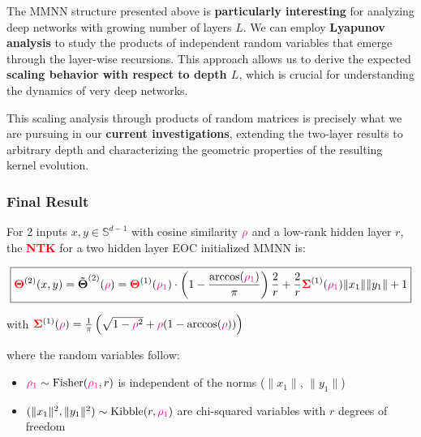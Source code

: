 \documentclass[a4paper]{article}
\theoremstyle{plain}
\theoremstyle{definition}
\theoremstyle{remark}
\begin{document}
\begin{tcolorbox}[colback=green!15,colframe=green!80!black,title={\textbf{Ongoing Research: Deep Network Scaling via Lyapunov Analysis}},enhanced,drop shadow,boxrule=2pt]
The MMNN structure presented above is \textbf{particularly interesting} for analyzing deep networks with growing number of layers $L$. We can employ \textbf{Lyapunov analysis} to study the products of independent random variables that emerge through the layer-wise recursions. This approach allows us to derive the expected \textbf{scaling behavior with respect to depth $L$}, which is crucial for understanding the dynamics of very deep networks.

This scaling analysis through products of random matrices is precisely what we are pursuing in our \textbf{current investigations}, extending the two-layer results to arbitrary depth and characterizing the geometric properties of the resulting kernel evolution.
\end{tcolorbox}


\subsubsection{Final Result}

\begin{tcolorbox}[colback=personalcontribcolor!10,colframe=personalcontribcolor,title={\textbf{MAIN RESULT}},enhanced,drop shadow,breakable]
For 2 inputs $x,y \in \mathbb{S}^{d-1}$ with cosine similarity $\textcolor{magenta}{\rho}$ and a low-rank hidden layer $r$, the \textcolor{red}{\textbf{NTK}} for a two hidden layer EOC initialized MMNN is:

\begin{equation}
\boxed{\textcolor{red}{\boldsymbol{\Theta}}^{(2)}(x,y) = \boldsymbol{\tilde{\Theta}}^{(2)}(\textcolor{magenta}{\rho}) = \textcolor{red}{\boldsymbol{\Theta}}^{(1)}(\textcolor{magenta}{\rho_1}) \cdot \left(1 - \frac{\arccos(\textcolor{magenta}{\rho_1})}{\pi}\right)\frac{2}{r} + \frac{2}{r}\textcolor{red}{\boldsymbol{\Sigma}}^{(1)}(\textcolor{magenta}{\rho_1})\|x_1\| \|y_1\| + 1}
\end{equation}

with $\textcolor{red}{\boldsymbol{\Sigma}}^{(1)}(\textcolor{magenta}{\rho}) = \frac{1}{\pi}\left(\sqrt{1-\textcolor{magenta}{\rho}^2} + \textcolor{magenta}{\rho}(1-\arccos(\textcolor{magenta}{\rho}))\right)$

where the random variables follow:
\begin{itemize}
\item $\textcolor{magenta}{\rho_1} \sim \text{Fisher}(\textcolor{magenta}{\rho_1}, r)$ is independent of the norms ($\|x_1\|$, $\|y_1\|$)
\item $(\|x_1\|^2, \|y_1\|^2) \sim \text{Kibble}(r, \textcolor{magenta}{\rho_1})$ are chi-squared variables with $r$ degrees of freedom
\end{itemize}
\end{tcolorbox} 
\end{document}
